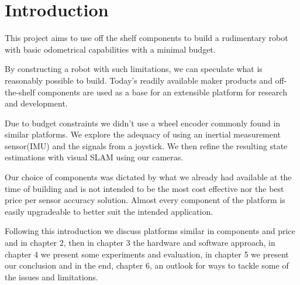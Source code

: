 \documentclass[class=report, crop=false]{standalone}
\begin{document}
\chapter{Introduction}\label{cha:introduction}

This project aims to use off the shelf components to build a rudimentary robot with basic odometrical capabilities with a minimal budget.

By constructing a robot with such limitations, we can speculate what is reasonably possible to build. Today's readily available maker products and off-the-shelf components are used as a base for an extensible platform for research and development.

Due to budget constraints we didn't use a wheel encoder commonly found in similar platforms. We explore the adequacy of using an inertial measurement sensor(IMU) and the signals from a joystick. We then refine the resulting state estimations with visual SLAM using our cameras.

Our choice of components was dictated by what we already had available at the time of building and is not intended to be the most cost effective nor the best price per sensor accuracy solution. Almost every component of the platform is  easily upgradeable to better suit the intended application.

Following this introduction we discuss platforms similar in components and price and in chapter 2, then in chapter 3 the hardware and software approach, in chapter 4 we present some experiments and evaluation, in chapter 5 we present our conclusion and in the end, chapter 6, an outlook for ways to tackle some of the issues and limitations.
\end{document}
